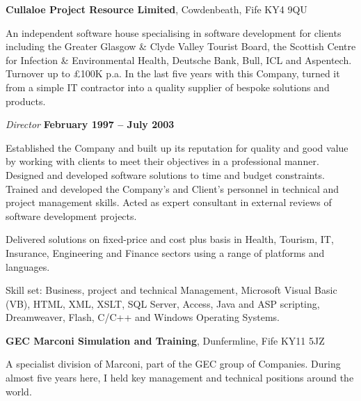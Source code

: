 \documentclass[10pt]{article}
\newenvironment{outerlist}[1][\enskip\textbullet]%
        {\begin{itemize}[#1]}{\end{itemize}%
         \vspace{-.6\baselineskip}}
\newenvironment{innerlist}[1][\enskip\textbullet]%
        {\begin{compactitem}[#1]}{\end{compactitem}}
\newcommand{\blankline}{\quad\pagebreak[2]}
\begin{document}
\blankline

\textbf{Cullaloe Project Resource Limited}, Cowdenbeath, Fife KY4 9QU

An independent software house specialising in software development for clients including the Greater Glasgow \& Clyde Valley Tourist Board, the Scottish Centre for Infection \& Environmental Health, Deutsche Bank, Bull, ICL and Aspentech. Turnover up to \pounds100K p.a. In the last five years with this Company, turned it from a simple IT contractor into a quality supplier of bespoke solutions and products.

\begin{outerlist}

\item[] \textit{Director}%
        \hfill \textbf{February 1997 -- July 2003}
\begin{innerlist}
\item Established the Company and built up its reputation for quality and good value by working with clients to meet their objectives in a professional manner. Designed and developed software solutions to time and budget constraints. Trained and developed the Company’s and Client’s personnel in technical and project management skills. Acted as expert consultant in external reviews of software development projects.

\item Delivered solutions on fixed-price and cost plus basis in Health, Tourism, IT, Insurance, Engineering and Finance sectors using a range of platforms and languages.

\item Skill set: Business, project and technical Management, Microsoft Visual Basic (VB), HTML, XML, XSLT, SQL Server, Access, Java and ASP scripting, Dreamweaver, Flash, C/C++ and Windows Operating Systems.
\end{innerlist}

\end{outerlist}


\blankline

\textbf{GEC Marconi Simulation and Training}, Dunfermline, Fife KY11 5JZ

A specialist division of Marconi, part of the GEC group of Companies. During almost five years here, I held key management and technical positions around the world.
\end{document}
